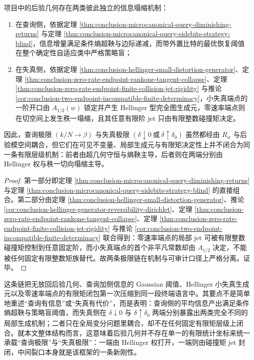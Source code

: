 \begin{theorem}[微正则后验几何与双端点失真几何之间的双重极限断裂]\label{thm:conclusion-posterior-distortion-double-limit-fracture}
项目中的后验几何存在两类彼此独立的信息塌缩机制：
\begin{enumerate}
  \item 在查询侧，依据定理 \ref{thm:conclusion-microcanonical-query-diminishing-returns} 与定理 \ref{thm:conclusion-microcanonical-query-sidebits-strategy-blind}，信息增量满足条件熵超鞅与边际递减，而带外置比特的最优恢复阈值在整个确定性自适应类中严格策略盲；
  \item 在失真侧，依据定理 \ref{thm:conclusion-hellinger-small-distortion-generator}、定理 \ref{thm:conclusion-zero-rate-endpoint-rankone-tangent-collapse}、定理 \ref{thm:conclusion-zero-rate-endpoint-finite-collision-jet-rigidity} 与推论 \ref{cor:conclusion-two-endpoint-incompatible-finite-determinacy}，小失真端点的一阶开口由 \(A_{1/2}(w)\) 锁定并产生 Hellinger 型完全图生成元，零速率端点则在切空间上发生秩一塌缩，且其任意有限阶 jet 只由有限整数碰撞矩决定。
\end{enumerate}
因此，查询极限 \((k/N\to\beta)\) 与失真极限 \((\delta\downarrow0\ \text{或}\ \delta\uparrow\delta_0)\) 虽然都经由 \(R_w\) 与后验模空间耦合，但它们在可见不变量、局部生成元与有限矩决定性上并不闭合为同一条有限层级机制：前者由超几何守恒与熵鞅主导，后者则在两端分别由 Hellinger 权与秩一切向塌缩主导。
\end{theorem}
\begin{proof}
第一部分即定理 \ref{thm:conclusion-microcanonical-query-diminishing-returns} 与定理 \ref{thm:conclusion-microcanonical-query-sidebits-strategy-blind} 的直接组合。第二部分由定理 \ref{thm:conclusion-hellinger-small-distortion-generator}、推论 \ref{cor:conclusion-hellinger-generator-reversibility-dirichlet}、定理 \ref{thm:conclusion-zero-rate-endpoint-rankone-tangent-collapse}、定理 \ref{thm:conclusion-zero-rate-endpoint-finite-collision-jet-rigidity} 与推论 \ref{cor:conclusion-two-endpoint-incompatible-finite-determinacy} 联合得到：零速率端点的局部 jet 可被有限整数碰撞矩控制到任意固定阶，而小失真端点的首个非平凡常数却由 \(A_{1/2}\) 决定，不能被任何固定有限整数矩族替代。故两条极限链在机制与可审计口径上严格分离。证毕。
\end{proof}

这条链把无放回后验几何、查询加侧信息的 Gaussian 阈值、Hellinger 小失真生成元以及零速率端点的有限矩闭包第一次压缩到同一段终端语言中。其要点不是简单地重述“查询有信息”或“失真有代价”，而是表明：查询侧的平均信息产出满足条件熵超鞅与策略盲阈值，而失真侧在 \(\delta\downarrow0\) 与 \(\delta\uparrow\delta_0\) 两端分别暴露出两类完全不同的局部生成机制；二者只在全局变分问题里耦合，却不在任何固定有限矩层级上闭合。就本文整体结构而言，这意味着后验几何并不存在单一的有限统计坐标来统一承载“查询极限”与“失真极限”：一端由 Hellinger 权打开，一端则由碰撞矩 jet 封闭，中间裂口本身就是该框架的一条新刚性。

\endinput
